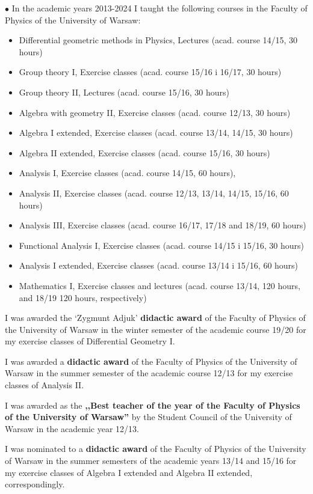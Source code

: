 \documentclass[12pt,reqno]{amsbook}
\begin{document}
$\bullet$ In the academic years 2013-2024 I taught the following courses in the Faculty of Physics of the University of Warsaw:
\begin{itemize}
\item Differential geometric methods in Physics, Lectures   (acad. course 14/15, 30 hours)
\item Group theory I, Exercise classes (acad. course 15/16 i 16/17, 30 hours)
\item Group theory II, Lectures  (acad. course  15/16, 30 hours)
\item  Algebra with geometry II, Exercise classes (acad. course 12/13, 30 hours)
\item  Algebra I extended, Exercise classes (acad. course 13/14, 14/15, 30 hours)
\item Algebra II extended,  Exercise classes (acad. course 15/16, 30 hours)
\item Analysis I,  Exercise classes (acad. course 14/15, 60 hours),
\item Analysis II,  Exercise classes (acad. course 12/13, 13/14, 14/15, 15/16, 60 hours) 
\item Analysis III, Exercise classes (acad. course 16/17, 17/18 and 18/19, 60 hours)
\item Functional Analysis I, Exercise classes (acad. course 14/15 i 15/16, 30 hours)
\item Analysis I extended, Exercise classes (acad. course 13/14 i 15/16, 60 hours)
\item Mathematics I, Exercise classes and lectures (acad. course 13/14, 120 hours, and 18/19 120 hours, respectively)

\end{itemize}

I was awarded the `Zygmunt Adjuk' {\bf didactic award} of the Faculty of Physics of the University of Warsaw in the winter semester of the academic course 19/20 for my exercise classes of Differential Geometry I.

I was awarded a {\bf didactic award} of the Faculty of Physics of the University of Warsaw in the summer semester of the academic course 12/13 for my exercise classes of Analysis II.

I was awarded as the {\bf ,,Best teacher of the year of the Faculty of Physics of the University of Warsaw''} by the Student Council of the University of Warsaw in the academic year 12/13.

I was nominated to a {\bf didactic award} of the Faculty of Physics of the University of Warsaw in the summer semesters of the academic years 13/14 and 15/16 for my exercise classes of Algebra I extended and Algebra II extended, correspondingly.
\end{document}

